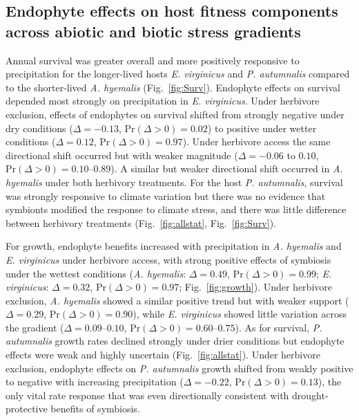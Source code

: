 \documentclass[12pt]{article}\usepackage[]{graphicx}\usepackage[dvipsnames]{xcolor}
\begin{document}
\subsection*{Endophyte effects on host fitness components across abiotic and biotic stress gradients}

Annual survival was greater overall and more positively responsive to precipitation for the longer-lived hosts \textit{E. virginicus} and \textit{P. autumnalis} compared to the shorter-lived \textit{A. hyemalis} (Fig.~\ref{fig:Surv}).
Endophyte effects on survival depended most strongly on precipitation in \textit{E. virginicus}. 
Under herbivore exclusion, effects of endophytes on survival shifted from strongly negative under dry conditions ($\Delta = -0.13$, $\mathrm{Pr}(\Delta > 0) = 0.02$) to positive under wetter conditions ($\Delta = 0.12$, $\mathrm{Pr}(\Delta > 0) = 0.97$). 
Under herbivore access the same directional shift occurred but with weaker magnitude ($\Delta = -0.06$ to $0.10$, $\mathrm{Pr}(\Delta > 0) = 0.10$--$0.89$). 
A similar but weaker directional shift occurred in \textit{A. hyemalis} under both herbivory treatments.
For the host \textit{P. autumnalis}, survival was strongly responsive to climate variation but there was no evidence that symbionts modified the response to climate stress, and there was little difference between herbivory treatments (Fig.~\ref{fig:allstat}, Fig.~\ref{fig:Surv}).

For growth, endophyte benefits increased with precipitation in \textit{A. hyemalis} and \textit{E. virginicus} under herbivore access, with strong positive effects of symbiosis under the wettest conditions (\textit{A. hyemalis}: $\Delta = 0.49$, $\mathrm{Pr}(\Delta > 0) = 0.99$; \textit{E. virginicus}: $\Delta = 0.32$, $\mathrm{Pr}(\Delta > 0) = 0.97$; Fig.~\ref{fig:growth}). 
Under herbivore exclusion, \textit{A. hyemalis} showed a similar positive trend but with weaker support ($\Delta = 0.29$, $\mathrm{Pr}(\Delta > 0) = 0.90$), while \textit{E. virginicus} showed little variation across the gradient ($\Delta = 0.09$--$0.10$, $\mathrm{Pr}(\Delta > 0) = 0.60$--$0.75$). 
As for survival, \textit{P. autumnalis} growth rates declined strongly under drier conditions but endophyte effects were weak and highly uncertain (Fig.~\ref{fig:allstat}). 
Under herbivore exclusion, endophyte effects on \textit{P. autumnalis} growth shifted from weakly positive to negative with increasing precipitation ($\Delta = -0.22$, $\mathrm{Pr}(\Delta > 0) = 0.13$), the only vital rate response that was even directionally consistent with drought-protective benefits of symbiosis.
\end{document}
